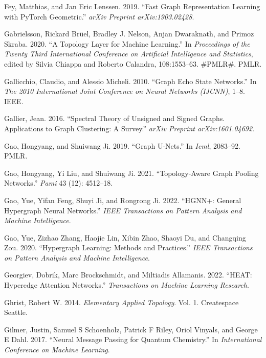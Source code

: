 \documentclass[
  12pt,
]{krantz}
\newlength{\cslhangindent}
\newenvironment{CSLReferences}[2] %
 {\begin{list}{}{%
  \setlength{\itemindent}{0pt}
  \setlength{\leftmargin}{0pt}
  \setlength{\parsep}{0pt}
  \ifodd #1
   \setlength{\leftmargin}{\cslhangindent}
   \setlength{\itemindent}{-1\cslhangindent}
  \fi
  \setlength{\itemsep}{#2\baselineskip}}}
 {\end{list}}
\begin{document}
\begin{CSLReferences}{1}{0}
Fey, Matthias, and Jan Eric Lenssen. 2019. {``Fast Graph Representation
Learning with {P}y{T}orch {G}eometric.''} \emph{arXiv Preprint
arXiv:1903.02428}.

Gabrielsson, Rickard Brüel, Bradley J. Nelson, Anjan Dwaraknath, and
Primoz Skraba. 2020. {``A Topology Layer for Machine Learning.''} In
\emph{Proceedings of the Twenty Third International Conference on
Artificial Intelligence and Statistics}, edited by Silvia Chiappa and
Roberto Calandra, 108:1553--63. \#PMLR\#. PMLR.

Gallicchio, Claudio, and Alessio Micheli. 2010. {``Graph Echo State
Networks.''} In \emph{The 2010 International Joint Conference on Neural
Networks (IJCNN)}, 1--8. IEEE.

Gallier, Jean. 2016. {``Spectral Theory of Unsigned and Signed Graphs.
Applications to Graph Clustering: A Survey.''} \emph{arXiv Preprint
arXiv:1601.04692}.

Gao, Hongyang, and Shuiwang Ji. 2019. {``Graph {U}-{N}ets.''} In
\emph{Icml}, 2083--92. PMLR.

Gao, Hongyang, Yi Liu, and Shuiwang Ji. 2021. {``Topology-Aware Graph
Pooling Networks.''} \emph{Pami} 43 (12): 4512--18.

Gao, Yue, Yifan Feng, Shuyi Ji, and Rongrong Ji. 2022. {``{HGNN}+:
General Hypergraph Neural Networks.''} \emph{IEEE Transactions on
Pattern Analysis and Machine Intelligence}.

Gao, Yue, Zizhao Zhang, Haojie Lin, Xibin Zhao, Shaoyi Du, and Changqing
Zou. 2020. {``Hypergraph Learning: Methods and Practices.''} \emph{IEEE
Transactions on Pattern Analysis and Machine Intelligence}.

Georgiev, Dobrik, Marc Brockschmidt, and Miltiadis Allamanis. 2022.
{``{HEAT}: Hyperedge Attention Networks.''} \emph{Transactions on
Machine Learning Research}.

Ghrist, Robert W. 2014. \emph{Elementary Applied Topology}. Vol. 1.
Createspace Seattle.

Gilmer, Justin, Samuel S Schoenholz, Patrick F Riley, Oriol Vinyals, and
George E Dahl. 2017. {``Neural Message Passing for Quantum Chemistry.''}
In \emph{International Conference on Machine Learning}.


\end{CSLReferences}
\end{document}
